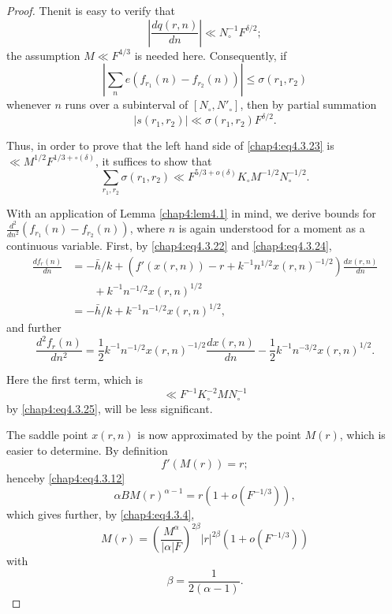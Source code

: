 \begin{proof}
Then\pageoriginale it is easy to verify that 
$$
\left|\frac{dq(r,n)}{dn}\right|\ll N_\circ^{-1}F^{\delta/2};
$$
the assumption $M\ll F^{4/3}$ is needed here. Consequently, if 
\begin{equation}\label{chap4:eq4.3.26}
\left|\sum\limits_ne\left(f_{r_1}(n)-f_{r_2}(n)\right)\right|\leq\sigma \left(r_1, r_2\right)
\end{equation}
whenever $n$ runs over a subinterval of $[N_\circ, N'_\circ]$, then by partial summation 
$$
\left|s\left(r_1,r_2\right)\right|\ll\sigma\left(r_1,r_2\right)F^{\delta/2}.
$$

Thus, in order to prove that the left hand side of \eqref{chap4:eq4.3.23} is $\ll M^{1/2}F^{1/3+\circ(\delta)}$, it suffices to show that
\begin{equation}\label{chap4:eq4.3.27}
\sum\limits_{r_1,r_2}\sigma\left(r_1,r_2\right)\ll F^{5/3+o(\delta)}K_\circ M^{-1/2} N_\circ^{-1/2}.
\end{equation}

With an application of Lemma \ref{chap4:lem4.1} in mind, we derive bounds for $\frac{d^2}{dn^2}(f_{r_1}(n)-f_{r_2}(n))$, where $n$ is again understood for a moment as a continuous variable. First, by \eqref{chap4:eq4.3.22} and \eqref{chap4:eq4.3.24},
\begin{align*}
\frac{df_r(n)}{dn} &= -\bar{h}/k+\left(f'(x(r,n))-r+k^{-1}n^{1/2}x(r,n)^{-1/2} \right)\frac{dx(r,n)}{dn}\\
&\qquad +k^{-1}n^{-1/2}x(r,n)^{1/2}\\
&= -\bar{h}/k+k^{-1}n^{-1/2}x(r,n)^{1/2},
\end{align*}
and further
\begin{equation}\label{chap4:eq4.3.28}
\frac{d^2f_r(n)}{dn^2}=\frac{1}{2}k^{-1}n^{-1/2}x(r,n)^{-1/2}\frac{dx(r,n)}{dn}- \frac{1}{2}k^{-1}n^{-3/2}x(r,n)^{1/2}.
\end{equation}

Here the first term, which is 
\begin{equation}\label{chap4:eq4.3.29}
\ll F^{-1}K_\circ^{-2}MN_\circ^{-1}
\end{equation}
by \eqref{chap4:eq4.3.25}, will be less significant.

The saddle point $x(r,n)$ is now approximated by the point $M(r)$, which is easier to determine. By definition
$$
f'(M(r))=r;
$$
hence\pageoriginale by \eqref{chap4:eq4.3.12}
$$
\alpha BM(r)^{\alpha-1}=r\left(1+o\left(F^{-1/3}\right)\right),
$$
which gives further, by \eqref{chap4:eq4.3.4},
\begin{equation}\label{chap4:eq4.3.30}
M(r)=\left(\frac{M^\alpha}{|\alpha|F}\right)^{2\beta}|r|^{2\beta}\left(1+o\left(
F^{-1/3}\right)\right) 
\end{equation}
with
$$
\beta=\frac{1}{2(\alpha-1)}. 
$$


\end{proof}
